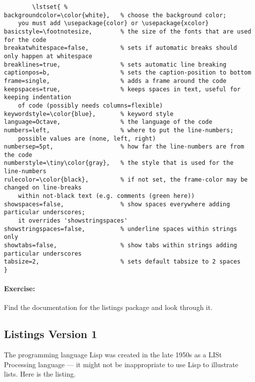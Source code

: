         \scriptsize{}
        \begin{verbatim}
        \lstset{ %
backgroundcolor=\color{white},   % choose the background color; 
    you must add \usepackage{color} or \usepackage{xcolor}
basicstyle=\footnotesize,        % the size of the fonts that are used for the code
breakatwhitespace=false,         % sets if automatic breaks should only happen at whitespace
breaklines=true,                 % sets automatic line breaking
captionpos=b,                    % sets the caption-position to bottom
frame=single,	                 % adds a frame around the code
keepspaces=true,                 % keeps spaces in text, useful for keeping indentation 
    of code (possibly needs columns=flexible)
keywordstyle=\color{blue},       % keyword style
language=Octave,                 % the language of the code
numbers=left,                    % where to put the line-numbers; 
    possible values are (none, left, right)
numbersep=5pt,                   % how far the line-numbers are from the code
numberstyle=\tiny\color{gray},   % the style that is used for the line-numbers
rulecolor=\color{black},         % if not set, the frame-color may be changed on line-breaks 
    within not-black text (e.g. comments (green here))
showspaces=false,                % show spaces everywhere adding particular underscores; 
    it overrides 'showstringspaces'
showstringspaces=false,          % underline spaces within strings only
showtabs=false,                  % show tabs within strings adding particular underscores
tabsize=2,	                     % sets default tabsize to 2 spaces
}
        \end{verbatim}

    \normalsize{}

        \paragraph{Exercise:} Find the documentation for the listings package and look through it.

        \subsection{Listings Version 1}
        \label{Listings Version 1}

    The programming language Lisp was created in the late 1950s as a LISt Processing language --- it might not be inappropriate to use Lisp to illustrate lists. Here is the listing.
        
